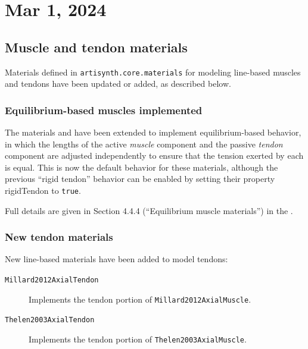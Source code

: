 \documentclass{article}
\begin{document}
\section*{Mar 1, 2024}

\subsection*{Muscle and tendon materials}

Materials defined in {\tt artisynth.core.materials} for modeling
line-based muscles and tendons have been updated or added, as
described below.

\subsubsection{Equilibrium-based muscles implemented}

The materials 
 and
have been extended to implement
equilibrium-based behavior, in which the lengths of the active {\it
muscle} component and the passive {\it tendon} component are adjusted
independently to ensure that the tension exerted by each is equal.
This is now the default behavior for these materials, although the
previous ``rigid tendon'' behavior can be enabled by setting their
property {\sf rigidTendon} to {\tt true}.

Full details are given in Section 4.4.4 (``Equilibrium muscle materials'') in
the .

\subsubsection{New tendon materials}

New line-based materials have been added to model tendons:

\begin{description}

\item[{\tt Millard2012AxialTendon}]\mbox{}

Implements the tendon portion of {\tt Millard2012AxialMuscle}.

\item[{\tt Thelen2003AxialTendon}]\mbox{}

Implements the tendon portion of {\tt Thelen2003AxialMuscle}.

\end{description}
\end{document}
